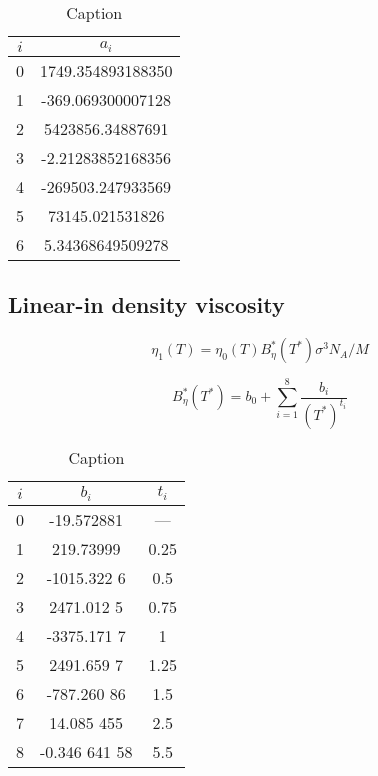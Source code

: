 \begin{table}[h]
    \centering
    \begin{tabular}{c|c}
        $i$ & $a_i$\\
        \hline  
        0 & 1749.354893188350\\
        1 & -369.069300007128\\
        2 & 5423856.34887691\\
        3 & -2.21283852168356\\
        4 & -269503.247933569\\
        5 & 73145.021531826\\
        6 & 5.34368649509278\\
    \end{tabular}
    \caption{Caption}
    \label{tab:my_label1}
\end{table}


\subsection{Linear-in density viscosity}

\begin{equation}
    \eta_1(T) = \eta_0(T)B^*_\eta(T^*)\sigma^3N_A/M 
\end{equation}

\begin{equation}
    B^*_\eta(T^*)=b_0+\sum^8_{i=1}\frac{b_i}{(T^*)^{t_i}}
\end{equation}

\begin{table}[ht]
    \centering
    \begin{tabular}{c|c|c}
    $i$&$b_i$&$t_i$\\
    \hline
    0   & -19.572881    &—\\  
    1   & 219.73999     &0.25\\       
    2   & -1015.322 6   &0.5 \\   
    3   & 2471.012 5    &0.75\\   
    4   & -3375.171 7   &1  \\
    5   & 2491.659 7    &1.25\\   
    6   & -787.260 86   &1.5 \\   
    7   & 14.085 455    &2.5 \\   
    8   & -0.346 641 58 &5.5\\
    \end{tabular}
    \caption{Caption}
    \label{tab:my_label2}
\end{table}

